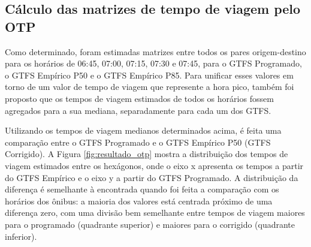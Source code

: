 \documentclass[        
    a4paper,          %
    12pt,             %
    chapter=TITLE,    %
    section=Title,    %
    subsection=Title, %
    oneside,          %
    english,          %
    spanish,          %
    brazil,           %
    fleqn             %
]{abntex2}
\begin{document}
  \hypertarget{calculo-das-matrizes-de-tempo-de-viagem-pelo-otp}{%
  \subsection{Cálculo das matrizes de tempo de viagem pelo OTP}\label{calculo-das-matrizes-de-tempo-de-viagem-pelo-otp}}
  
  Como determinado, foram estimadas matrizes entre todos os pares origem-destino para os horários de 06:45, 07:00, 07:15, 07:30 e 07:45, para o GTFS Programado, o GTFS Empírico P50 e o GTFS Empírico P85. Para unificar esses valores em torno de um valor de tempo de viagem que represente a hora pico, também foi proposto que os tempos de viagem estimados de todos os horários fossem agregados para a sua mediana, separadamente para cada um dos GTFS.
  
  Utilizando os tempos de viagem medianos determinados acima, é feita uma comparação entre o GTFS Programado e o GTFS Empírico P50 (GTFS Corrigido). A Figura \ref{fig:resultado_otp} mostra a distribuição dos tempos de viagem estimados entre os hexágonos, onde o eixo x apresenta os tempos a partir do GTFS Empírico e o eixo y a partir do GTFS Programado. A distribuição da diferença é semelhante à encontrada quando foi feita a comparação com os horários dos ônibus: a maioria dos valores está centrada próximo de uma diferença zero, com uma divisão bem semelhante entre tempos de viagem maiores para o programado (quadrante superior) e maiores para o corrigido (quadrante inferior).
  
  \begin{figure}[!h]
  \captionsetup{width=16cm}
  \centering
  \end{figure}
  
\end{document}
